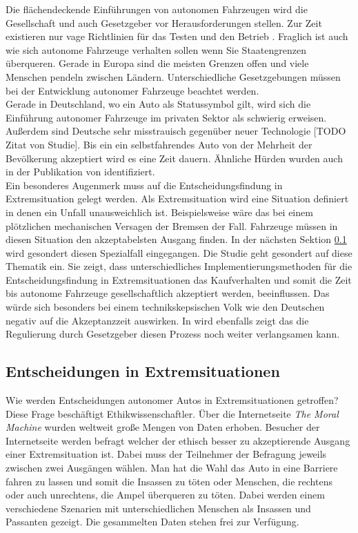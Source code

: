 Die flächendeckende Einführungen von autonomen Fahrzeugen wird die Gesellschaft und auch Gesetzgeber vor Herausforderungen stellen. Zur Zeit existieren nur vage Richtlinien für das Testen und den Betrieb \cite{doi:10.1080/01441647.2018.1494640}. Fraglich ist auch wie sich autonome Fahrzeuge verhalten sollen wenn Sie Staatengrenzen überqueren. Gerade in Europa sind die meisten Grenzen offen und viele Menschen pendeln zwischen Ländern. Unterschiedliche Gesetzgebungen müssen bei der Entwicklung autonomer Fahrzeuge beachtet werden.\\

Gerade in Deutschland, wo ein Auto als Statussymbol gilt, wird sich die Einführung autonomer Fahrzeuge im privaten Sektor als schwierig erweisen. Außerdem sind Deutsche sehr misstrauisch gegenüber neuer Technologie [TODO Zitat von Studie]. Bis ein ein selbstfahrendes Auto von der Mehrheit der Bevölkerung akzeptiert wird es eine Zeit dauern. Ähnliche Hürden wurden auch in der Publikation \cite{roadblocks} von \citeauthor{roadblocks} identifiziert.\\

Ein besonderes Augenmerk muss auf die Entscheidungsfindung in Extremsituation gelegt werden. Als Extremsituation wird eine Situation definiert in denen ein Unfall unausweichlich ist. Beispielsweise wäre das bei einem plötzlichen mechanischen Versagen der Bremsen der Fall. Fahrzeuge müssen in diesen Situation den akzeptabelsten Ausgang finden. In der nächsten Sektion \ref{ssec:entscheidungen-in-extremsituationen} wird gesondert diesen Spezialfall eingegangen. Die Studie \cite{socialDilemma} geht gesondert auf diese Thematik ein. Sie zeigt, dass unterschiedliches Implementierungsmethoden für die Entscheidungsfindung in Extremsituationen das Kaufverhalten und somit die Zeit bis autonome Fahrzeuge gesellschaftlich akzeptiert werden, beeinflussen. Das würde sich besonders bei einem technikskepsischen Volk wie den Deutschen negativ auf die Akzeptanzzeit auswirken. In \citeauthor{socialDilemma} wird ebenfalls zeigt das die Regulierung durch Gesetzgeber diesen Prozess noch weiter verlangsamen kann.\\


\subsection{Entscheidungen in Extremsituationen}
\label{ssec:entscheidungen-in-extremsituationen}

Wie werden Entscheidungen autonomer Autos in Extremsituationen getroffen? Diese Frage beschäftigt Ethikwissenschaftler. Über die Internetseite \textit{The Moral Machine} wurden weltweit große Mengen von Daten erhoben. Besucher der Internetseite werden befragt welcher der ethisch besser zu akzeptierende Ausgang einer Extremsituation ist. Dabei muss der Teilnehmer der Befragung jeweils zwischen zwei Ausgängen wählen. Man hat die Wahl das Auto in eine Barriere fahren zu lassen und somit die Insassen zu töten oder Menschen, die rechtens oder auch unrechtens, die Ampel überqueren zu töten. Dabei werden einem verschiedene Szenarien mit unterschiedlichen Menschen als Insassen und Passanten gezeigt. Die gesammelten Daten stehen frei zur Verfügung.\\

